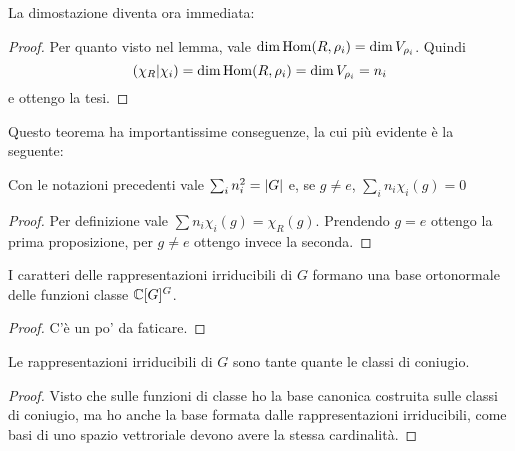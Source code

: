 La dimostazione diventa ora immediata:
\begin{proof}
  Per quanto visto nel lemma, vale $\dim \operatorname{Hom}(R,\rho_i) = \dim V_{\rho_i}$. Quindi
  \[
  \left(\chi_R | \chi_i\right)= \dim \operatorname{Hom}(R,\rho_i) = \dim V_{\rho_i} = n_i
  \]
  e ottengo la tesi.
\end{proof}

Questo teorema ha importantissime conseguenze, la cui più evidente è la seguente:
\begin{myprop}
  Con le notazioni precedenti vale $\sum_i n_i^2 = \left|G\right|$ e, se $g\ne e$, $\sum_i n_i \chi_i(g)=0$
\end{myprop}
\begin{proof}
  Per definizione vale $\sum n_i \chi_i(g) = \chi_R(g)$. Prendendo $g=e$ ottengo la prima proposizione, per $g\ne e$ ottengo invece la seconda.
\end{proof}

\begin{mytheorem}
  I caratteri delle rappresentazioni irriducibili di $G$ formano una base ortonormale delle funzioni classe $\mathbb C[G]^G$.
\end{mytheorem}

\begin{proof}
  C'è un po' da faticare.
\end{proof}


\begin{mytheorem}
  Le rappresentazioni irriducibili di $G$ sono tante quante le classi di coniugio.
\end{mytheorem}

\begin{proof}
  Visto che sulle funzioni di classe ho la base canonica costruita sulle classi di coniugio, ma ho anche la base formata dalle rappresentazioni irriducibili, come basi di uno spazio vettroriale devono avere la stessa cardinalità.
\end{proof}






